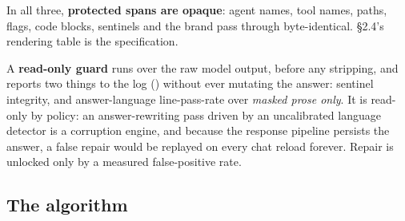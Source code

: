 In all three, \textbf{protected spans are opaque}: agent names, tool names,
paths, flags, code blocks, sentinels and the brand pass through byte-identical.
\S2.4's rendering table is the specification.

A \textbf{read-only guard} runs over the raw model output, before any stripping,
and reports two things to the log (\code{--- [I18N-GUARD]}) without ever
mutating the answer: sentinel integrity, and answer-language line-pass-rate over
\emph{masked prose only}. It is read-only by policy: an answer-rewriting pass
driven by an uncalibrated language detector is a corruption engine, and because
the response pipeline persists the answer, a false repair would be replayed on
every chat reload forever. Repair is unlocked only by a measured false-positive
rate.

\subsection{The algorithm}
\label{sec:nepantla-algorithm}

